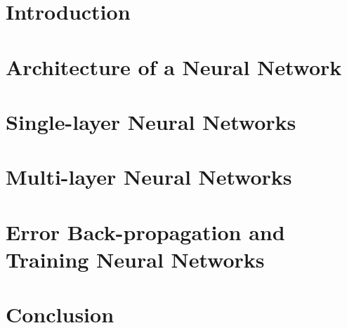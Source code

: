 \documentclass[a4paper,12pt,two column]{article}
\author{Aman Uddin}
\begin{document}

\section{Introduction}\label{sec:introduction}
    
\section{Architecture of a Neural Network}\label{sec:architecture}
    
\section{Single-layer Neural Networks}\label{sec:singlelayer}
    
\section{Multi-layer Neural Networks}\label{sec:multilayer}
    
\section{Error Back-propagation and Training Neural Networks}\label{sec:back}
    
\section{Conclusion}\label{sec:conc}
    
\printbibliography

\end{document}
